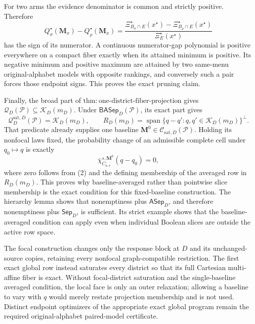 For two arms the evidence denominator is common and strictly positive.  Therefore
\[
Q_\sigma^\star(\mathbf M_x)-Q_\rho^\star(\mathbf M_x)
=\frac{\Xi_{B_\sigma\cap E}^\star(x^\star)
-\Xi_{B_\rho\cap E}^\star(x^\star)}
{\Xi_E^\star(x^\star)}
\]
has the sign of its numerator.  A continuous numerator-gap polynomial is positive everywhere on a compact fiber exactly when its attained minimum is positive.  Its negative minimum and positive maximum are attained by two same-menu original-alphabet models with opposite rankings, and conversely such a pair forces those endpoint signs.  This proves the exact pruning claim.

Finally, the broad part of \(\mathrm{thm:one\text{-}district\text{-}fiber\text{-}projection}\) gives \(\mathcal Q_D(\mathcal P)\subseteq\mathcal K_D(m_D)\).  Under \(\mathsf{BASep}_D(\mathcal P)\), its exact part gives
\[
\mathcal Q_D^{\mathrm{sat},D}(\mathcal P)=\mathcal K_D(m_D),
\qquad
R_D(m_D)=\operatorname{span}\{q-q':q,q'\in\mathcal K_D(m_D)\}^\perp.
\tag{2}
\]
That predicate already supplies one baseline \(\mathbf M^0\in\mathcal C_{\mathrm{sat},D}(\mathcal P)\).  Holding its nonfocal laws fixed, the probability change of an admissible complete cell under \(q_0\mapsto q\) is exactly
\[
\bar\chi_{C_{a,v}}^{s,\mathbf M^0}(q-q_0)=0,
\]
where zero follows from (2) and the defining membership of the averaged row in \(R_D(m_D)\).  This proves why baseline-averaged rather than pointwise slice membership is the exact condition for this fixed-baseline construction.  The hierarchy lemma shows that nonemptiness plus \(\mathsf{ASep}_D\), and therefore nonemptiness plus \(\mathsf{Sep}_D\), is sufficient.  Its strict example shows that the baseline-averaged condition can apply even when individual Boolean slices are outside the active row space.

The focal construction changes only the response block at \(D\) and its unchanged-source copies, retaining every nonfocal graph-compatible restriction.  The first exact global row instead saturates every district so that its full Cartesian multi-affine fiber is exact.  Without focal-district saturation and the single-baseline averaged condition, the local face is only an outer relaxation; allowing a baseline to vary with \(q\) would merely restate projection membership and is not used.  Distinct endpoint optimizers of the appropriate exact global program remain the required original-alphabet paired-model certificate.